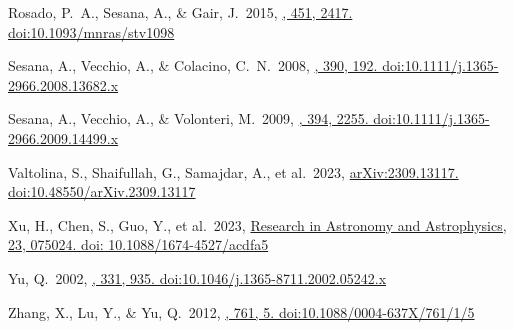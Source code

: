 \documentclass[twocolumn]{aastex631}
\begin{document}
\begin{thebibliography}{0}
Rosado, P.~A., Sesana, A., \& Gair, J.\ 2015, 
\href{https://ui.adsabs.harvard.edu/abs/2015MNRAS.451.2417R}
{\mnras, 451, 2417. doi:10.1093/mnras/stv1098}

Sesana, A., Vecchio, A., \& Colacino, C.~N.\ 2008, 
\href{https://ui.adsabs.harvard.edu/abs/2008MNRAS.390..192S}
{\mnras, 390, 192. doi:10.1111/j.1365-2966.2008.13682.x}

Sesana, A., Vecchio, A., \& Volonteri, M.\ 2009, 
\href{https://ui.adsabs.harvard.edu/abs/2009MNRAS.394.2255S}
{\mnras, 394, 2255. doi:10.1111/j.1365-2966.2009.14499.x}

Valtolina, S., Shaifullah, G., Samajdar, A., et al.\ 2023, 
\href{https://ui.adsabs.harvard.edu/abs/2023arXiv230913117V}
{arXiv:2309.13117. doi:10.48550/arXiv.2309.13117}

Xu, H., Chen, S., Guo, Y., et al.\ 2023, 
\href{https://ui.adsabs.harvard.edu/abs/2023RAA....23g5024X}
{Research in Astronomy and Astrophysics, 23, 075024. 
doi: 10.1088/1674-4527/acdfa5}

Yu, Q.\ 2002, 
\href{https://ui.adsabs.harvard.edu/abs/2020ApJ...897...86C}
{\mnras, 331, 935. doi:10.1046/j.1365-8711.2002.05242.x}

Zhang, X., Lu, Y., \& Yu, Q.\ 2012, 
\href{https://ui.adsabs.harvard.edu/abs/2012ApJ...761....5Z}
{\apj, 761, 5. doi:10.1088/0004-637X/761/1/5}

\end{thebibliography}
\end{document}
